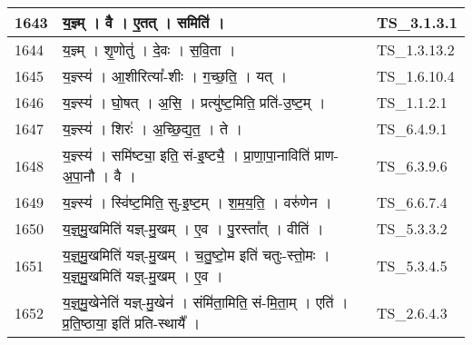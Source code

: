 \documentclass[17pt]{extarticle}
\begin{document}
\begin{longtable}{||p{0.4in}||p{4.9in}||p{0.9in}||}
    \hline
        
    1643 & य॒ज्ञ्म्   ।   वै   ।   ए॒तत्   ।   समिति॑   ।    & TS\_3.1.3.1       \\
    
    \hline
        
    1644 & य॒ज्ञ्म्   ।   शृ॒णोतु॑   ।   दे॒वः   ।   स॒वि॒ता   ।    & TS\_1.3.13.2       \\
    
    \hline
        
    1645 & य॒ज्ञ्स्य॑   ।   आ॒शीरित्या᳚{-}शीः   ।   ग॒च्छ॒ति॒   ।   यत्   ।    & TS\_1.6.10.4       \\
    
    \hline
        
    1646 & य॒ज्ञ्स्य॑   ।   घो॒षत्   ।   अ॒सि॒   ।   प्रत्यु॑ष्ट॒मिति॒ प्रति॑{-}उ॒ष्ट॒म्   ।    & TS\_1.1.2.1       \\
    
    \hline
        
    1647 & य॒ज्ञ्स्य॑   ।   शिरः॑   ।   अ॒च्छि॒द्य॒त॒   ।   ते   ।    & TS\_6.4.9.1       \\
    
    \hline
        
    1648 & य॒ज्ञ्स्य॑   ।   समि॑ष्ट्या॒ इति॒ सं{-}इ॒ष्ट्यै॒   ।   प्रा॒णा॒पा॒नाविति॑ प्राण{-}अ॒पा॒नौ   ।   वै   ।    & TS\_6.3.9.6       \\
    
    \hline
        
    1649 & य॒ज्ञ्स्य॑   ।   स्वि॑ष्ट॒मिति॒ सु{-}इ॒ष्ट॒म्   ।   श॒म॒य॒ति॒   ।   वरु॑णेन   ।    & TS\_6.6.7.4       \\
    
    \hline
        
    1650 & य॒ज्ञ्॒मु॒खमिति॑ यज्ञ्{-}मु॒खम्   ।   ए॒व   ।   पु॒रस्ता᳚त्   ।   वीति॑   ।    & TS\_5.3.3.2       \\
    
    \hline
        
    1651 & य॒ज्ञ्॒मु॒खमिति॑ यज्ञ्{-}मु॒खम्   ।   च॒तु॒ष्टो॒म इति॑ चतुः{-}स्तो॒मः   ।   य॒ज्ञ्॒मु॒खमिति॑ यज्ञ्{-}मु॒खम्   ।   ए॒व   ।    & TS\_5.3.4.5       \\
    
    \hline
        
    1652 & य॒ज्ञ्॒मु॒खेनेति॑ यज्ञ्{-}मु॒खेन॑   ।   संमि॑ता॒मिति॒ सं{-}मि॒ता॒म्   ।   एति॑   ।   प्र॒ति॒ष्ठाया॒ इति॑ प्रति{-}स्थायै᳚   ।    & TS\_2.6.4.3       \\
    

\end{longtable}
\end{document}
